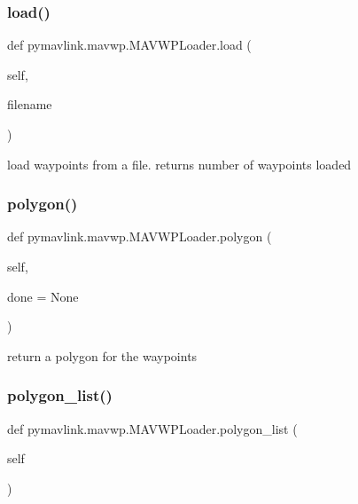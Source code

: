 \subsubsection{\texorpdfstring{load()}{load()}}
{\footnotesize\ttfamily def pymavlink.\+mavwp.\+M\+A\+V\+W\+P\+Loader.\+load (\begin{DoxyParamCaption}\item[{}]{self,  }\item[{}]{filename }\end{DoxyParamCaption})}

\begin{DoxyVerb}load waypoints from a file.
returns number of waypoints loaded\end{DoxyVerb}
 \mbox{\label{classpymavlink_1_1mavwp_1_1MAVWPLoader_a200db285358c83ec7f112a1268b6c858}} 
\subsubsection{\texorpdfstring{polygon()}{polygon()}}
{\footnotesize\ttfamily def pymavlink.\+mavwp.\+M\+A\+V\+W\+P\+Loader.\+polygon (\begin{DoxyParamCaption}\item[{}]{self,  }\item[{}]{done = {\ttfamily None} }\end{DoxyParamCaption})}

\begin{DoxyVerb}return a polygon for the waypoints\end{DoxyVerb}
 \mbox{\label{classpymavlink_1_1mavwp_1_1MAVWPLoader_aec3fe4c657e6ee74b219e53f3c43f472}} 
\subsubsection{\texorpdfstring{polygon\+\_\+list()}{polygon\_list()}}
{\footnotesize\ttfamily def pymavlink.\+mavwp.\+M\+A\+V\+W\+P\+Loader.\+polygon\+\_\+list (\begin{DoxyParamCaption}\item[{}]{self }\end{DoxyParamCaption})}

